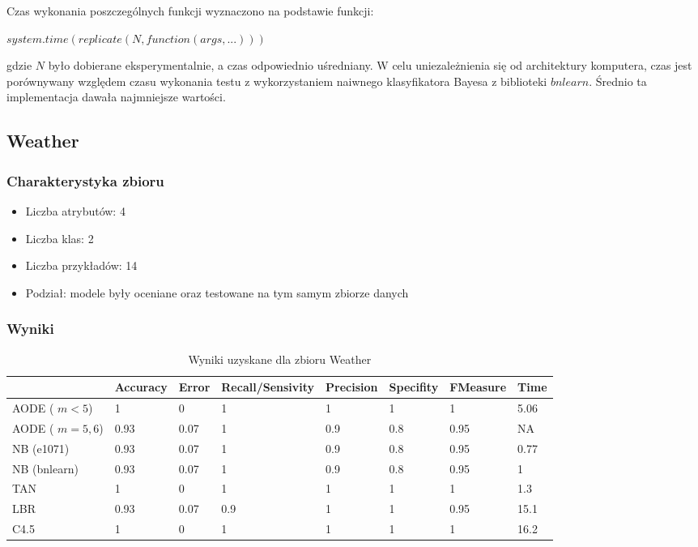 \documentclass[16]{article}
\begin{document}
Czas wykonania poszczególnych funkcji wyznaczono na podstawie funkcji:
\begin{center}
$system.time(replicate(N, function(args, ...)))$
\end{center}
 gdzie $N$ było dobierane eksperymentalnie, a czas odpowiednio uśredniany. W celu uniezależnienia się od architektury komputera, czas jest porównywany względem czasu wykonania testu z wykorzystaniem naiwnego klasyfikatora Bayesa z biblioteki $bnlearn$. Średnio ta implementacja dawała najmniejsze wartości.

\subsection{Weather}

\subsubsection{Charakterystyka zbioru}

\begin{itemize}
	\item Liczba atrybutów: 4
	\item Liczba klas: 2
	\item Liczba przykładów: 14
	\item Podział: modele były oceniane oraz testowane na tym samym zbiorze danych
\end{itemize}

\subsubsection{Wyniki}

\begin{table}[ht]
\begin{center}
\begin{tabular}{ |l|l|l|l|l|l|l|l| }
\hline
&  Accuracy & Error & Recall/Sensivity & Precision & Specifity & FMeasure & Time
\\ \hline
AODE ( $m < 5$)& 1 & 0 & 1 & 1 & 1 & 1 & 5.06
\\ \hline
AODE ( $m = 5, 6$) & 0.93 & 0.07 & 1 & 0.9 & 0.8 & 0.95 & NA
\\ \hline
NB (e1071) & 0.93 & 0.07 & 1 & 0.9 & 0.8 & 0.95 & 0.77
\\ \hline
NB (bnlearn) & 0.93 & 0.07 & 1 & 0.9 & 0.8 & 0.95 & 1
\\ \hline
TAN & 1 & 0 & 1 & 1 & 1 & 1 & 1.3
\\ \hline
LBR & 0.93 & 0.07 & 0.9 & 1 & 1 & 0.95 & 15.1
\\ \hline
C4.5 & 1 & 0 & 1 & 1 & 1 & 1 & 16.2
\\ \hline
\end{tabular}
\\\caption{Wyniki uzyskane dla zbioru Weather}
\end{center}
\end{table}
\end{document}
